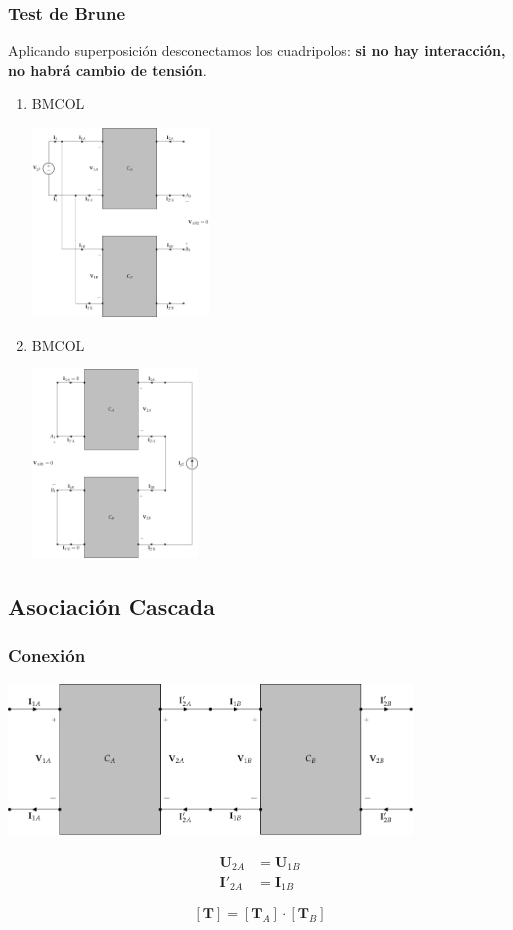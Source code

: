 \subsubsection{Test de Brune}
\label{sec:org7667a46}
Aplicando superposición desconectamos los cuadripolos: \textbf{si no hay interacción, no habrá cambio de tensión}.
\begin{enumerate}
\item \hfill{}\textsc{BMCOL}
\label{sec:orga5560fd}

\includegraphics[height=5cm]{../figs/paralelo-serie-brune-entrada.pdf}

\item \hfill{}\textsc{BMCOL}
\label{sec:org4d90737}

\includegraphics[height=5cm]{../figs/paralelo-serie-brune-salida.pdf}

\end{enumerate}
\subsection{Asociación Cascada}
\label{sec:org0d5b08b}

\subsubsection{Conexión}
\label{sec:org41e64cd}

\includegraphics[height=4cm]{../figs/cascada.pdf}


\begin{align*}
  \mathbf{U}_{2A} &= \mathbf{U}_{1B}\\
  \mathbf{I}'_{2A} &= \mathbf{I}_{1B}
\end{align*}


\[
  \boxed{[\mathbf{T}] = [\mathbf{T}_A] \cdot [\mathbf{T}_B]}
\]

